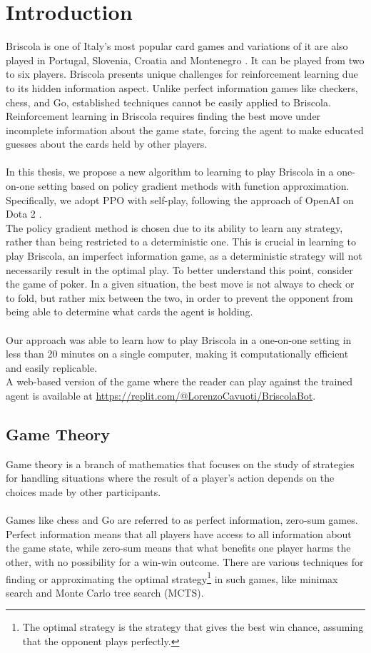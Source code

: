 \chapter{Introduction}
Briscola is one of Italy's most popular card games and variations of it are also played in Portugal, Slovenia, Croatia and Montenegro \cite{briscola-wikipedia}. It can be played from two to six players. Briscola presents unique challenges for reinforcement learning due to its hidden information aspect. Unlike perfect information games like checkers, chess, and Go, established techniques cannot be easily applied to Briscola. Reinforcement learning in Briscola requires finding the best move under incomplete information about the game state, forcing the agent to make educated guesses about the cards held by other players.\\\\
In this thesis, we propose a new algorithm to learning to play Briscola in a one-on-one setting based on policy gradient methods with function approximation. Specifically, we adopt PPO with self-play, following the approach of OpenAI on Dota 2 \cite{open-ai-five}.\\
The policy gradient method is chosen due to its ability to learn any strategy, rather than being restricted to a deterministic one. This is crucial in learning to play Briscola, an imperfect information game, as a deterministic strategy will not necessarily result in the optimal play. To better understand this point, consider the game of poker. In a given situation, the best move is not always to check or to fold, but rather mix between the two, in order to prevent the opponent from being able to determine what cards the agent is holding.\\\\
Our approach was able to learn how to play Briscola in a one-on-one setting in less than 20 minutes on a single computer, making it computationally efficient and easily replicable.\\
A web-based version of the game where the reader can play against the trained agent is available at \url{https://replit.com/@LorenzoCavuoti/BriscolaBot}.

\section{Game Theory}
Game theory is a branch of mathematics that focuses on the study of strategies for handling situations where the result of a player's action depends on the choices made by other participants.\\\\
Games like chess and Go are referred to as perfect information, zero-sum games. Perfect information means that all players have access to all information about the game state, while zero-sum means that what benefits one player harms the other, with no possibility for a win-win outcome. There are various techniques for finding or approximating the optimal strategy\footnote{The optimal strategy is the strategy that gives the best win chance, assuming that the opponent plays perfectly.} in such games, like minimax search and Monte Carlo tree search (MCTS).

